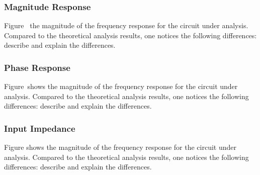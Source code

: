 \subsubsection{Magnitude Response}

Figure~ the magnitude of the frequency response for the
circuit under analysis. Compared to the theoretical analysis results, one
notices the following differences: describe and explain the differences.



\subsubsection{Phase Response}

Figure~shows the magnitude of the frequency response for the
circuit under analysis. Compared to the theoretical analysis results, one
notices the following differences: describe and explain the differences.


\subsubsection{Input Impedance}

Figure shows the magnitude of the frequency response for the
circuit under analysis. Compared to the theoretical analysis results, one
notices the following differences: describe and explain the differences.





